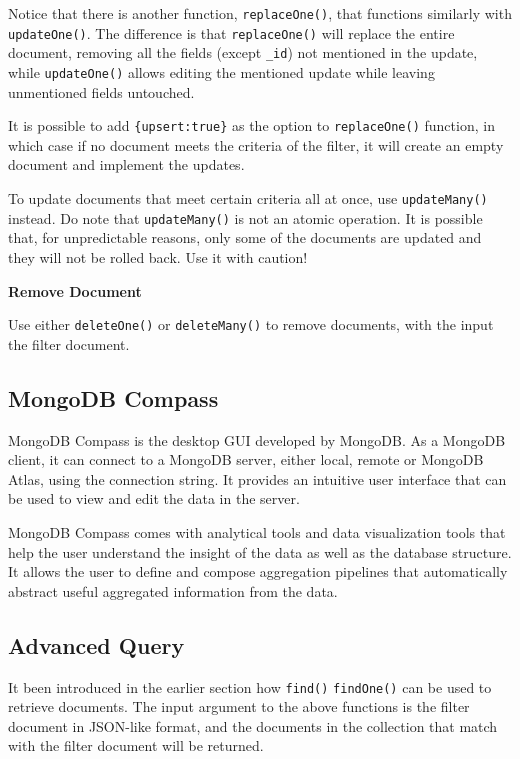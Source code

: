Notice that there is another function, \verb|replaceOne()|, that functions similarly with \verb|updateOne()|. The difference is that \verb|replaceOne()| will replace the entire document, removing all the fields (except \verb|_id|) not mentioned in the update, while \verb|updateOne()| allows editing the mentioned update while leaving unmentioned fields untouched.

It is possible to add \verb|{upsert:true}| as the option to \verb|replaceOne()| function, in which case if no document meets the criteria of the filter, it will create an empty document and implement the updates.

To update documents that meet certain criteria all at once, use \verb|updateMany()| instead. Do note that \verb|updateMany()| is not an atomic operation. It is possible that, for unpredictable reasons, only some of the documents are updated and they will not be rolled back. Use it with caution!

\vspace{0.1in}
\noindent \textbf{Remove Document}
\vspace{0.1in}

Use either \verb|deleteOne()| or \verb|deleteMany()| to remove documents, with the input the filter document.

\subsection{MongoDB Compass}

MongoDB Compass is the desktop GUI developed by MongoDB. As a MongoDB client, it can connect to a MongoDB server, either local, remote or MongoDB Atlas, using the connection string. It provides an intuitive user interface that can be used to view and edit the data in the server. 

MongoDB Compass comes with analytical tools and data visualization tools that help the user understand the insight of the data as well as the database structure. It allows the user to define and compose aggregation pipelines that automatically abstract useful aggregated information from the data.

\subsection{Advanced Query}

It been introduced in the earlier section how \verb|find()| \verb|findOne()| can be used to retrieve documents. The input argument to the above functions is the filter document in JSON-like format, and the documents in the collection that match with the filter document will be returned.

